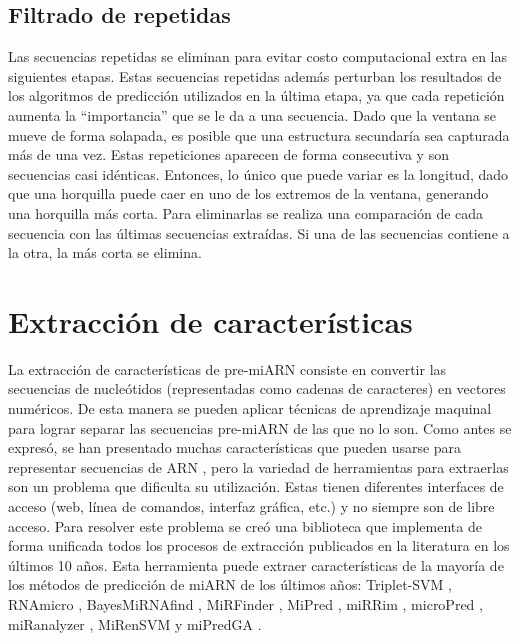 \subsection{Filtrado de repetidas}

Las secuencias repetidas se eliminan para evitar costo computacional extra en las siguientes etapas. Estas secuencias repetidas además perturban los
resultados de los algoritmos de predicción utilizados en la última etapa, ya que cada repetición aumenta la “importancia” que se le da a una secuencia.
 Dado que la ventana se mueve de forma solapada, es posible que una estructura secundaría sea capturada más de una vez. Estas repeticiones aparecen de forma
 consecutiva y son secuencias casi idénticas. Entonces, lo único que puede variar es la longitud, dado que una horquilla puede caer en uno de los extremos de la
 ventana, generando una horquilla más corta. Para eliminarlas se realiza una comparación de cada secuencia con las últimas secuencias extraídas. Si una de las
 secuencias contiene a la otra, la más corta se elimina.

\section{Extracción de características}

La extracción de características de pre-miARN consiste en convertir las secuencias de nucleótidos (representadas como cadenas de caracteres) en vectores
numéricos. De esta manera se pueden aplicar técnicas de aprendizaje maquinal para lograr separar las secuencias pre-miARN de las que no lo son. Como antes se
expresó, se han presentado muchas características que pueden usarse para representar secuencias de ARN \citep{Lopes2014}, pero la variedad de herramientas para
extraerlas son un problema que dificulta su utilización. Estas tienen diferentes interfaces de acceso (web, línea de comandos, interfaz gráfica, etc.) y no
siempre son de libre acceso. Para resolver este problema se creó una biblioteca que implementa de forma unificada todos los procesos de extracción publicados en
la literatura en los últimos 10 años. Esta herramienta puede extraer características de la mayoría de los métodos de predicción de miARN de los últimos años:
Triplet-SVM \citep{xue2005classification}, RNAmicro \citep{hertel2006hairpins}, BayesMiRNAfind \citep{yousef2006combining}, MiRFinder
\citep{huang2007mirfinder}, MiPred \citep{jiang2007mipred}, miRRim \citep{terai2007mirrim}, microPred \citep{batuwita2009micropred}, miRanalyzer
\citep{hackenberg2009miranalyzer}, MiRenSVM \citep{ding2010mirensvm} y miPredGA \citep{xuan2011genetic}.

